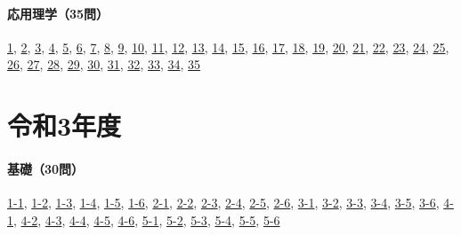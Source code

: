 \paragraph{応用理学（35問）} \hyperref[q:r02-reg-applied-01]{1}, \hyperref[q:r02-reg-applied-02]{2}, \hyperref[q:r02-reg-applied-03]{3}, \hyperref[q:r02-reg-applied-04]{4}, \hyperref[q:r02-reg-applied-05]{5}, \hyperref[q:r02-reg-applied-06]{6}, \hyperref[q:r02-reg-applied-07]{7}, \hyperref[q:r02-reg-applied-08]{8}, \hyperref[q:r02-reg-applied-09]{9}, \hyperref[q:r02-reg-applied-10]{10}, \hyperref[q:r02-reg-applied-11]{11}, \hyperref[q:r02-reg-applied-12]{12}, \hyperref[q:r02-reg-applied-13]{13}, \hyperref[q:r02-reg-applied-14]{14}, \hyperref[q:r02-reg-applied-15]{15}, \hyperref[q:r02-reg-applied-16]{16}, \hyperref[q:r02-reg-applied-17]{17}, \hyperref[q:r02-reg-applied-18]{18}, \hyperref[q:r02-reg-applied-19]{19}, \hyperref[q:r02-reg-applied-20]{20}, \hyperref[q:r02-reg-applied-21]{21}, \hyperref[q:r02-reg-applied-22]{22}, \hyperref[q:r02-reg-applied-23]{23}, \hyperref[q:r02-reg-applied-24]{24}, \hyperref[q:r02-reg-applied-25]{25}, \hyperref[q:r02-reg-applied-26]{26}, \hyperref[q:r02-reg-applied-27]{27}, \hyperref[q:r02-reg-applied-28]{28}, \hyperref[q:r02-reg-applied-29]{29}, \hyperref[q:r02-reg-applied-30]{30}, \hyperref[q:r02-reg-applied-31]{31}, \hyperref[q:r02-reg-applied-32]{32}, \hyperref[q:r02-reg-applied-33]{33}, \hyperref[q:r02-reg-applied-34]{34}, \hyperref[q:r02-reg-applied-35]{35}
\section{令和3年度}
\paragraph{基礎（30問）} \hyperref[q:r03-reg-basic-1-1]{1-1}, \hyperref[q:r03-reg-basic-1-2]{1-2}, \hyperref[q:r03-reg-basic-1-3]{1-3}, \hyperref[q:r03-reg-basic-1-4]{1-4}, \hyperref[q:r03-reg-basic-1-5]{1-5}, \hyperref[q:r03-reg-basic-1-6]{1-6}, \hyperref[q:r03-reg-basic-2-1]{2-1}, \hyperref[q:r03-reg-basic-2-2]{2-2}, \hyperref[q:r03-reg-basic-2-3]{2-3}, \hyperref[q:r03-reg-basic-2-4]{2-4}, \hyperref[q:r03-reg-basic-2-5]{2-5}, \hyperref[q:r03-reg-basic-2-6]{2-6}, \hyperref[q:r03-reg-basic-3-1]{3-1}, \hyperref[q:r03-reg-basic-3-2]{3-2}, \hyperref[q:r03-reg-basic-3-3]{3-3}, \hyperref[q:r03-reg-basic-3-4]{3-4}, \hyperref[q:r03-reg-basic-3-5]{3-5}, \hyperref[q:r03-reg-basic-3-6]{3-6}, \hyperref[q:r03-reg-basic-4-1]{4-1}, \hyperref[q:r03-reg-basic-4-2]{4-2}, \hyperref[q:r03-reg-basic-4-3]{4-3}, \hyperref[q:r03-reg-basic-4-4]{4-4}, \hyperref[q:r03-reg-basic-4-5]{4-5}, \hyperref[q:r03-reg-basic-4-6]{4-6}, \hyperref[q:r03-reg-basic-5-1]{5-1}, \hyperref[q:r03-reg-basic-5-2]{5-2}, \hyperref[q:r03-reg-basic-5-3]{5-3}, \hyperref[q:r03-reg-basic-5-4]{5-4}, \hyperref[q:r03-reg-basic-5-5]{5-5}, \hyperref[q:r03-reg-basic-5-6]{5-6}

